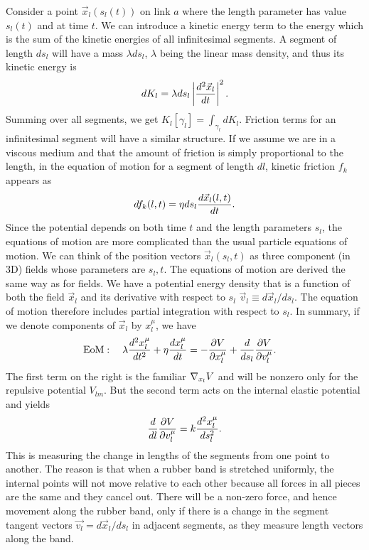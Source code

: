 \documentclass[endfloats,nofootinbib,preprint,floatfix,titlepage,superscriptaddress,linenumbers]{revtex4-1} %
\begin{document}
Consider a point $\vec{x}_l(s_l(t))$ on link $a$ where the length parameter has value $s_l(t)$ and at time $t$. We can introduce a kinetic energy term to the energy which is the sum of the kinetic energies of all infinitesimal segments.
A segment of length $ds_l$ will have a mass $\lambda ds_l $, $\lambda$ being the linear mass density, and thus its kinetic energy is
\[dK_l = \lambda ds_l \left|d^2 \vec{x}_l \over dt \right|^2.\]
Summing over all segments, we get $K_l[\gamma_l] = \int_{\gamma_l} dK_l$. Friction terms for an infinitesimal segment will have a similar structure. If we assume we are in a viscous medium and that the amount of friction is simply proportional to the length, in the equation of motion for a segment of length $dl$, kinetic friction $f_k$ appears as 
\[df_k(l,t) =\eta ds_l {d\vec{x}_l(l,t)\over dt}.\] 
Since the potential depends on both time $t$ and the length parameters $s_l$, the equations of motion are more complicated than the usual particle equations of motion. 
We can think of the position vectors $\vec{x}_l (s_l,t)$ as three component (in 3D) fields whose parameters are $s_l,t$. 
The equations of motion are derived the same way as for fields. 
We have a potential energy density that is a function of both the field $\vec{x}_l$ and its derivative with respect to $s_l$  $\vec{v}_l \equiv d\vec{x}_l/ds_l$. 
The equation of motion therefore includes partial integration with respect to $s_l$. 
In summary, if we denote components of $\vec{x}_l$ by $x_l^\mu$, we have 
\begin{align}
    \mbox{EoM}:\quad \lambda {d^2 x_l^\mu \over dt^2} +\eta {dx_l^\mu \over dt} & =  -{\partial V \over \partial x_l^\mu} + {d\over ds_l} {\partial V \over \partial v_l^\mu}.   \label{eq:Langevin}
\end{align}
The first term on the right is the familiar $\nabla_{x_l} V$ and will be nonzero only for the repulsive potential $V_{lm}$. But the second term acts on the internal elastic potential and yields \[{d\over dl} {\partial V \over \partial v_l^\mu} = k {d^2 x_l^\mu \over ds_l^2}.\]  
This is measuring the change in lengths of the segments from one point to another. The reason is that when a rubber band is stretched uniformly, the internal points will not move relative to each other because all forces in all pieces are the same and they cancel out. There will be a non-zero force, and hence movement along the rubber band, only if there is a change in the segment tangent vectors $\vec{v_l} = d\vec{x}_l/ds_l$ in adjacent segments, as they measure length vectors along the band.
\end{document}

